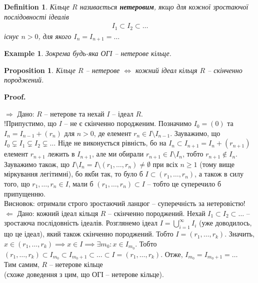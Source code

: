 \documentclass[a4paper, 10pt]{article}
\makeatletter
\def\rightproof{$\boxed{\Rightarrow}$ }
\def\leftproof{$\boxed{\Leftarrow}$ }
\theoremstyle{theoremdd}
\theoremstyle{theoremdd}
\newtheorem{definition}[theorem]{Definition}
\theoremstyle{theoremdd}
\theoremstyle{theoremdd}
\theoremstyle{theoremdd}
\newtheorem{example}[theorem]{Example}
\theoremstyle{theoremdd}
\theoremstyle{theoremdd}
\theoremstyle{theoremdd}
\theoremstyle{theoremdd}
\newtheorem{proposition}[theorem]{Proposition}
\theoremstyle{theoremdd}
\theoremstyle{theoremdd}
\theoremstyle{theoremdd}
\theoremstyle{theoremdd}
\theoremstyle{theoremdd}
\theoremstyle{theoremdd}
\renewenvironment{proof}[1][Proof.\\]{\par
\pushQED{\hfill \qed}%
\normalfont \topsep6\p@\@plus6\p@\relax
\trivlist
\item\relax
{\bfseries
#1\@addpunct{.}}\hspace\labelsep\ignorespaces
}{%
\popQED\endtrivlist\@endpefalse
}
\makeatother
\begin{document}
\begin{definition}
Кільце $R$ називається \textbf{нетеровим}, якщо для кожної зростаючої послідовності ідеалів
\begin{align*}
I_1 \subset I_2 \subset \dots
\end{align*}
існує $n>0$, для якого $I_n = I_{n+1} = \dots$
\end{definition}

\begin{example}
Зокрема будь-яка ОГІ -- нетерове кільце.
\end{example}

\begin{proposition}
Кільце $R$ -- нетерове $\iff $ кожний ідеал кільця $R$ -- скінченно породжений.
\end{proposition}

\begin{proof}
\rightproof Дано: $R$ -- нетерове та нехай $I$ -- ідеал $R$. \\
!Припустимо, що $I$ -- не є скінченно породженим. Позначимо $I_0 = (0)$ та $I_n = I_{n-1} + (r_n)$ для $n > 0$, де елемент $r_n \in I \setminus I_{n-1}$. Зауважимо, що $I_0 \subsetneq I_1 \subsetneq I_2 \subsetneq \dots$ Ніде не виконується рівність, бо на $I_{n} \subset I_{n+1} = I_{n} + (r_{n+1})$ елемент $r_{n+1}$ лежить в $I_{n+1}$, але ми обирали $r_{n+1} \in I \setminus I_n$, тобто $r_{n+1} \notin I_n$. Зауважимо також, що $I \setminus I_n = I \setminus (r_1,\dots,r_n) \neq \emptyset$ при всіх $n \geq 1$ (тому вище міркування легітимні), бо якби так, то було б $I \subset (r_1,\dots,r_n)$, а також в силу того, що $r_1,\dots,r_n \in I$, мали б $(r_1,\dots,r_n) \subset I$ -- тобто це суперечило б припущенню.\\
Висновок: отримали строго зростаючий ланцюг -- суперечність за нетеровістю!
\bigskip \\
\leftproof Дано: кожний ідеал кільця $R$ -- скінченно породжений. Нехай $I_1 \subset I_2 \subset \dots$ -- зростаюча послідовність ідеалів. Розглянемо ідеал $I = \displaystyle\bigcup_{i=1}^\infty I_i$ (уже доводилось, що це ідеал), який також скінченно породжений. Тобто $I = (r_1,\dots,r_k)$. Значить, $x \in (r_1,\dots,r_k) \implies x \in I \implies \exists m_0: x \in I_{m_0}$. Тобто $(r_1,\dots,r_k) \subset I_{m_0} \subset I_{m_0 + 1} \subset \dots \subset I = (r_1,\dots,r_k)$. Отже, $I_{m_0} = I_{m_0+1} = \dots$ \\
Тим самим, $R$ -- нетерове кільце \\
(схоже доведення з цим, що ОГІ -- нетерове кільце).
\end{proof}
\end{document}
